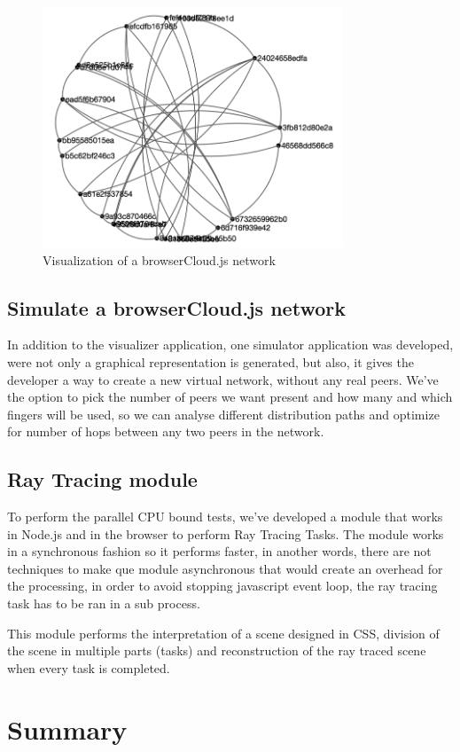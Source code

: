 \begin{figure}[h!]
  \centering
  \includegraphics[width=0.8\textwidth]{figs/visualizer}
  \caption{Visualization of a browserCloud.js network}
  \label{fig:visualizer}
\end{figure}

\subsection{Simulate a browserCloud.js network}

In addition to the visualizer application, one simulator application was developed, were not only a graphical representation is generated, but also, it gives the developer a way to create a new virtual network, without any real peers. We've the option to pick the number of peers we want present and how many and which fingers will be used, so we can analyse different distribution paths and optimize for number of hops between any two peers in the network.

\subsection{Ray Tracing module}

To perform the parallel CPU bound tests, we've developed a module that works in Node.js and in the browser to perform Ray Tracing Tasks. The module works in a synchronous fashion so it performs faster, in another words, there are not techniques to make que module asynchronous that would create an overhead for the processing, in order to avoid stopping javascript event loop, the ray tracing task has to be ran in a sub process.

This module performs the interpretation of a scene designed in CSS, division of the scene in multiple parts (tasks) and reconstruction of the ray traced scene when every task is completed.

\section{Summary}


